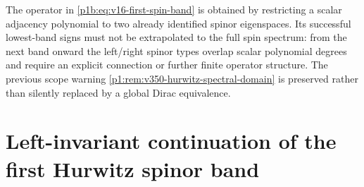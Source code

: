\documentclass[11pt]{article}
\begin{document}
\begin{remark}
\label{p1b:rem:v16-spin-scope}
The operator in \eqref{p1b:eq:v16-first-spin-band} is obtained
by restricting a scalar adjacency polynomial to two already
identified spinor eigenspaces.  Its successful lowest-band signs
must not be extrapolated to the full spin spectrum: from the next
band onward the left/right spinor types overlap scalar polynomial
degrees and require an explicit connection or further finite
operator structure.  The previous scope warning
\ref{p1:rem:v350-hurwitz-spectral-domain} is preserved rather
than silently replaced by a global Dirac equivalence.
\end{remark}



\section{Left-invariant continuation of the first Hurwitz spinor band}
\label{p1b:sec:v17-anisotropic-hurwitz-spin-bridge}
\end{document}
